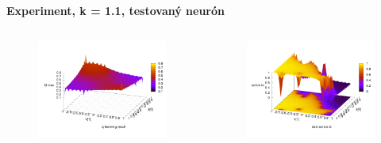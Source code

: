 \documentclass[xcolor=dvipsnames]{beamer}
\begin{document}
\begin{frame}{\bf Experiment, k = 1.1, testovaný neurón}

\begin{columns}
	\begin{column}{0.5\textwidth}

        \begin{figure}[ht]

        \begin{center}
        \includegraphics[width=1.0\textwidth]{experiment_01/testing_neuron/q_map.png}
        \end{center}

        \end{figure}

	\end{column}
	\begin{column}{0.5\textwidth}

        \begin{figure}[ht]

        \begin{center}
        \includegraphics[width=1.0\textwidth]{experiment_01/testing_neuron/q_action_id.png}
        \end{center}


\end{figure}
\end{column}
\end{columns}
\end{frame}
\end{document}
